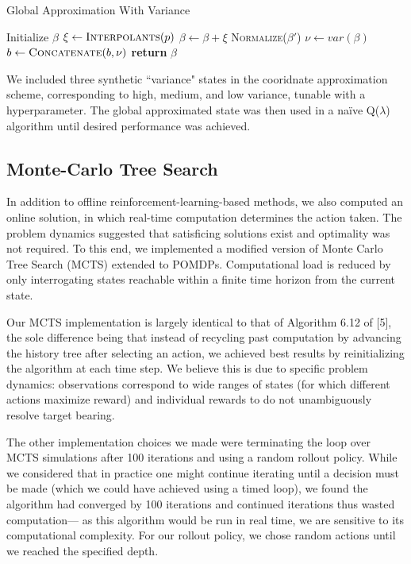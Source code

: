 \documentclass{article}
\begin{document}
\begin{algorithm}[H]
    \caption{Global Approximation With Variance}
    \begin{algorithmic}[1] %
          \State Initialize $\beta$
              \State $\xi \gets \textsc{Interpolants}(p)$
              \State $\beta \gets \beta + \xi$
          \EndFor
          \State \textsc{Normalize}($\beta'$)
          \State $\nu \gets var(\beta)$
              \State $b \gets \textsc{Concatenate}(b, \nu)$
          \EndFor
          \State \textbf{return} $\beta$
        \EndFunction
    \end{algorithmic}
\end{algorithm}

We included three synthetic ``variance" states in the cooridnate approximation scheme, corresponding to high, medium, and low variance, tunable with a hyperparameter. The global approximated state was then used in a naïve Q($\lambda$) algorithm until desired performance was achieved.

\subsection{Monte-Carlo Tree Search }
\par In addition to offline reinforcement-learning-based methods, we also computed an online solution, in which real-time computation determines the action taken. The problem dynamics suggested that satisficing solutions exist and optimality was not required. To this end,  we implemented a modified version of Monte Carlo Tree Search (MCTS) extended to POMDPs. Computational load is reduced by only interrogating states reachable within a finite time horizon from the current state.

\par Our MCTS implementation is largely identical to that of Algorithm 6.12 of [5], the sole difference being that instead of recycling past computation by advancing the history tree after selecting an action, we achieved best results by reinitializing the algorithm at each time step. We believe this is due to specific problem dynamics: observations correspond to wide ranges of states (for which different actions maximize reward) and individual rewards to do not unambiguously resolve target bearing.

\par The other implementation choices we made were terminating the loop over MCTS simulations after 100 iterations and using a random rollout policy. While we considered that in practice one might continue iterating until a decision must be made (which we could have achieved using a timed loop), we found the algorithm had converged by 100 iterations and continued iterations thus wasted computation--- as this algorithm would be run in real time, we are sensitive to its computational complexity. For our rollout policy, we chose random actions until we reached the specified depth.
\end{document}
